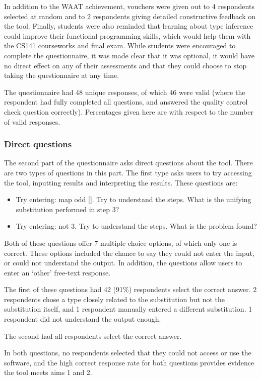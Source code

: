 \documentclass[a4paper,fleqn,12pt]{article}
\begin{document}
In addition to the WAAT achievement, vouchers were given out to 4 respondents selected at random and to 2 respondents giving detailed constructive feedback on the tool. Finally, students were also reminded that learning about type inference could improve their functional programming skills, which would help them with the CS141 courseworks and final exam. While students were encouraged to complete the questionnaire, it was made clear that it was optional, it would have no direct effect on any of their assessments and that they could choose to stop taking the questionnaire at any time.

The questionnaire had 48 unique responses, of which 46 were valid (where the respondent had fully completed all questions, and answered the quality control check question correctly). Percentages given here are with respect to the number of valid responses.
\subsubsection{Direct questions}\label{id:h.abykou9pzwwh}
The second part of the questionnaire asks direct questions about the tool. There are two types of questions in this part. The first type asks users to try accessing the tool, inputting results and interpreting the results. These questions are:
\begin{itemize}
  \item Try entering: map odd []. Try to understand the steps. What is the unifying substitution performed in step 3?
  \item Try entering: not 3. Try to understand the steps. What is the problem found?
\end{itemize}
Both of these questions offer 7 multiple choice options, of which only one is correct. These options included the chance to say they could not enter the input, or could not understand the output. In addition, the questions allow users to enter an ‘other’ free-text response.

The first of these questions had 42 (91\%) respondents select the correct answer. 2 respondents chose a type closely related to the substitution but not the substitution itself, and 1 respondent manually entered a different substitution. 1 respondent did not understand the output enough.

The second had all respondents select the correct answer.

In both questions, no respondents selected that they could not access or use the software, and the high correct response rate for both questions provides evidence the tool meets aims 1 and 2.
\end{document}
